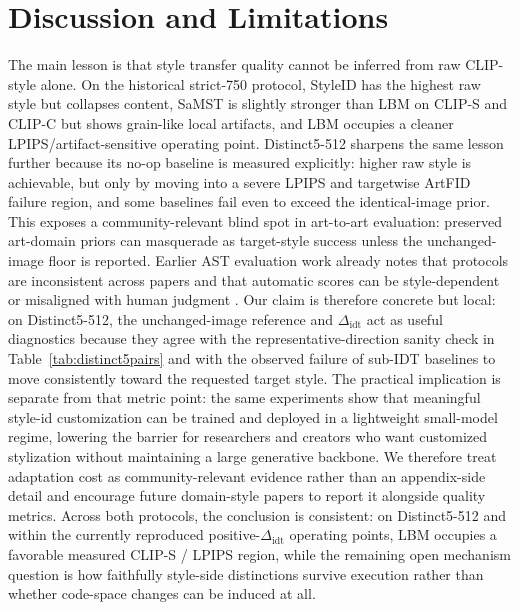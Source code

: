 \documentclass[letterpaper]{article}
\begin{document}
\section{Discussion and Limitations}
The main lesson is that style transfer quality cannot be inferred from raw CLIP-style alone. On the historical strict-750 protocol, StyleID has the highest raw style but collapses content, SaMST is slightly stronger than LBM on CLIP-S and CLIP-C but shows grain-like local artifacts, and LBM occupies a cleaner LPIPS/artifact-sensitive operating point. Distinct5-512 sharpens the same lesson further because its no-op baseline is measured explicitly: higher raw style is achievable, but only by moving into a severe LPIPS and targetwise ArtFID failure region, and some baselines fail even to exceed the identical-image prior. This exposes a community-relevant blind spot in art-to-art evaluation: preserved art-domain priors can masquerade as target-style success unless the unchanged-image floor is reported. Earlier AST evaluation work already notes that protocols are inconsistent across papers and that automatic scores can be style-dependent or misaligned with human judgment \cite{zhou2024comprehensiveeval,yeh2020calibrated,wright2022artfid}. Our claim is therefore concrete but local: on Distinct5-512, the unchanged-image reference and $\Delta_{\mathrm{idt}}$ act as useful diagnostics because they agree with the representative-direction sanity check in Table~\ref{tab:distinct5pairs} and with the observed failure of sub-IDT baselines to move consistently toward the requested target style. The practical implication is separate from that metric point: the same experiments show that meaningful style-id customization can be trained and deployed in a lightweight small-model regime, lowering the barrier for researchers and creators who want customized stylization without maintaining a large generative backbone. We therefore treat adaptation cost as community-relevant evidence rather than an appendix-side detail and encourage future domain-style papers to report it alongside quality metrics. Across both protocols, the conclusion is consistent: on Distinct5-512 and within the currently reproduced positive-$\Delta_{\mathrm{idt}}$ operating points, LBM occupies a favorable measured CLIP-S / LPIPS region, while the remaining open mechanism question is how faithfully style-side distinctions survive execution rather than whether code-space changes can be induced at all.
\end{document}
